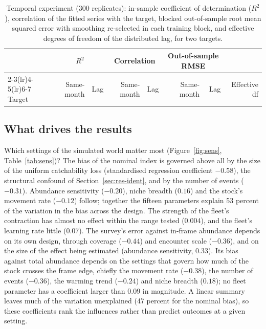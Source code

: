 \documentclass[11pt,a4paper]{article}
\begin{document}
\begin{table}[tbp]
\centering\footnotesize
\caption{Temporal experiment (300 replicates): in-sample coefficient of determination ($R^2$), correlation of the fitted series with the target, blocked out-of-sample root mean squared error with smoothing re-selected in each training block, and effective degrees of freedom of the distributed lag, for two targets.}
\label{tab:temporal}
\begin{tabular}{@{}lrrrrrrr@{}}
\toprule
 & \multicolumn{2}{c}{$R^2$} & \multicolumn{2}{c}{Correlation} & \multicolumn{2}{c}{Out-of-sample RMSE} & \\
\cmidrule(lr){2-3}\cmidrule(lr){4-5}\cmidrule(lr){6-7}
Target & Same-month & Lag & Same-month & Lag & Same-month & Lag & Effective df \\
\midrule
\bottomrule
\end{tabular}
\end{table}

\subsection{What drives the results}
\label{sec:res-sens}

Which settings of the simulated world matter most (Figure~\ref{fig:sens}, Table~\ref{tab:sens})? The bias of the nominal index is governed above all by the size of the uniform catchability loss (standardised regression coefficient $-0.58$), the structural confound of Section~\ref{sec:res-ident}, and by the number of events ($-0.31$). Abundance sensitivity ($-0.20$), niche breadth ($0.16$) and the stock's movement rate ($-0.12$) follow; together the fifteen parameters explain 53 percent of the variation in the bias across the design. The strength of the fleet's contraction has almost no effect within the range tested ($0.004$), and the fleet's learning rate little ($0.07$). The survey's error against in-frame abundance depends on its own design, through coverage ($-0.44$) and encounter scale ($-0.36$), and on the size of the effect being estimated (abundance sensitivity, $0.33$). Its bias against total abundance depends on the settings that govern how much of the stock crosses the frame edge, chiefly the movement rate ($-0.38$), the number of events ($-0.36$), the warming trend ($-0.24$) and niche breadth ($0.18$); no fleet parameter has a coefficient larger than 0.09 in magnitude. A linear summary leaves much of the variation unexplained (47 percent for the nominal bias), so these coefficients rank the influences rather than predict outcomes at a given setting.
\end{document}
